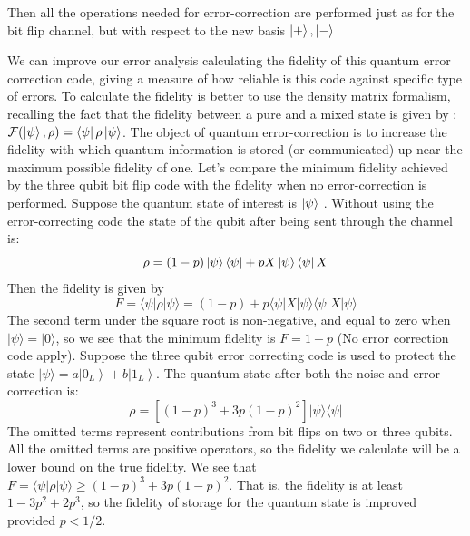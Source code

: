 Then all the operations needed for error-correction are performed just as for the bit flip channel, but with respect to the new basis $\ket{+},\ket{-}$


We can improve our error analysis calculating the fidelity of this quantum error correction code, giving a measure of how reliable is this code against specific type of errors.
To calculate the fidelity is better to use the density matrix formalism, recalling the fact that the fidelity between a pure and a mixed state is given by :$ \mathcal{F}(\ket{\psi},\rho) = \bra{\psi}\rho\ket{\psi}$.
The object of quantum error-correction is to increase the fidelity with which quantum information is stored (or communicated) up near the maximum possible fidelity of one. Let’s compare the minimum fidelity achieved by the three qubit bit flip code with the fidelity when no error-correction is performed.
Suppose the quantum state of interest is $\ket{\psi}$ .
Without using the error-correcting code the state of the qubit after being sent through the channel is: 
\begin{equation*}
    \rho = (1-p)\ket{\psi}\bra{\psi} + p X\ket{\psi}\bra{\psi}X
\end{equation*}
Then the fidelity is given by
$$
F=\langle\psi|\rho| \psi\rangle=(1-p)+p\langle\psi|X| \psi\rangle\langle\psi|X| \psi\rangle
$$
The second term under the square root is non-negative, and equal to zero when $|\psi\rangle=|0\rangle$, so we see that the minimum fidelity is $F=1-p$ (No error correction code apply). Suppose the three qubit error correcting code is used to protect the state $|\psi\rangle=a\left|0_{L}\right\rangle+b\left|1_{L}\right\rangle.$ The quantum state after both the noise and error-correction is:
$$
\rho=\left[(1-p)^{3}+3 p(1-p)^{2}\right]|\psi\rangle\langle\psi|
$$
The omitted terms represent contributions from bit flips on two or three qubits. All the omitted terms are positive operators, so the fidelity we calculate will be a lower bound on the true fidelity. We see that $F=\langle\psi|\rho| \psi\rangle \geq (1-p)^{3}+3 p(1-p)^{2}$. That is, the fidelity is at least $1-3 p^{2}+2 p^{3}$, so the fidelity of storage for the quantum state is improved provided $p<1 / 2$.


